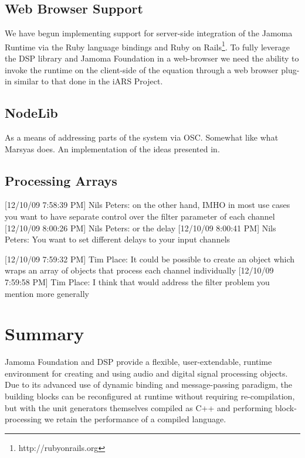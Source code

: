 \documentclass[twoside,10pt]{article}
\begin{document}
\subsection{Web Browser Support}
We have begun implementing support for server-side integration of the Jamoma Runtime via the Ruby language bindings and Ruby on Rails\footnote{http://rubyonrails.org}.  To fully leverage the DSP library and Jamoma Foundation in a web-browser we need the ability to invoke the runtime on the client-side of the equation through a web browser plug-in similar to that done in the iARS Project\cite{Frauenberger:2003}.


\subsection{NodeLib}

As a means of addressing parts of the system via OSC.  Somewhat like what Marsyas does.  An implementation of the ideas presented in\cite{Place:2008osc}.

\subsection{Processing Arrays}
[12/10/09 7:58:39 PM] Nils Peters: on the other hand, IMHO in most use cases you want to have separate control over the filter parameter of each channel
[12/10/09 8:00:26 PM] Nils Peters: or the delay
[12/10/09 8:00:41 PM] Nils Peters: You want to set different delays to your input channels

[12/10/09 7:59:32 PM] Tim Place: It could be possible to create an object which wraps an array of objects that process each channel individually
[12/10/09 7:59:58 PM] Tim Place: I think that would address the filter problem you mention more generally





\section{Summary} %

Jamoma Foundation and DSP provide a flexible, user-extendable, runtime environment for creating and using audio and digital signal processing objects.  Due to its advanced use of dynamic binding and message-passing paradigm, the building blocks can be reconfigured at runtime without requiring re-compilation, but with the unit generators themselves compiled as C++ and performing block-processing we retain the performance of a compiled language.
\end{document}
